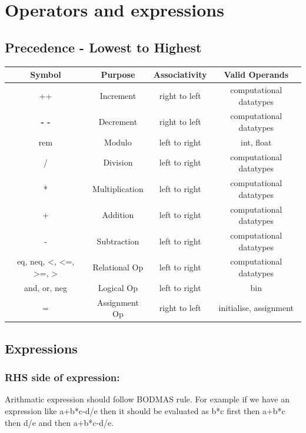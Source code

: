 \documentclass[12pt]{article}
\begin{document}
\section{Operators and expressions}
\subsection{Precedence - Lowest to Highest}
\begin{table}[ht]
\centering
\renewcommand{\arraystretch}{1.5} %
\setlength{\tabcolsep}{15pt} %
\begin{tabular}{|c|c|c|c|}
\hline
\textbf{Symbol} & \textbf{Purpose} & \textbf{Associativity} & \textbf{Valid Operands} \\
\hline
++ & Increment & right to left & computational datatypes \\
\hline
\textbf{- -} & Decrement & right to left & computational datatypes \\
\hline
rem & Modulo & left to right & int, float  \\
\hline
/ & Division  & left to right & computational datatypes \\
\hline
* &  Multiplication & left to right & computational datatypes \\
\hline
+ &  Addition & left to right & computational datatypes  \\
\hline
- &  Subtraction & left to right & computational datatypes \\
\hline
eq, neq, <, <=, >=, > & Relational Op & left to right & computational datatypes \\
\hline
and, or, neg & Logical Op & left to right & bin \\
\hline
= & Assignment Op & right to left & initialise, assignment \\
\hline
\end{tabular}
\end{table}

\subsection{Expressions}
    \subsubsection{ RHS side of expression:}
    Arithmatic expression should follow BODMAS rule.
    For example if we have an expression like a+b*c-d/e then it should be evaluated as b*c first then a+b*c then d/e and then a+b*c-d/e.
\end{document}
